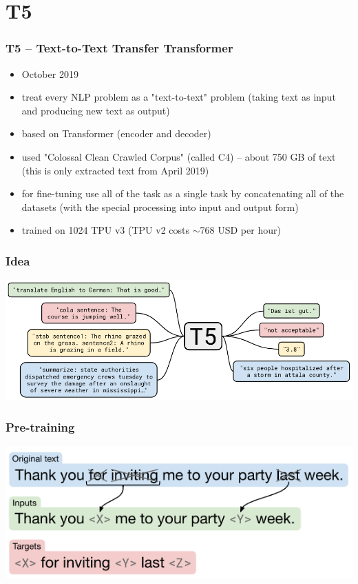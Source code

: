 \documentclass{beamer}
\begin{document}
\section{T5}
\begin{frame}
    \frametitle{T5 -- Text-to-Text Transfer Transformer \cite{t5}}
    \begin{itemize}
        \item October 2019
        \item treat every NLP problem as a "text-to-text" problem (taking text as input and producing new text as output)
        \item based on Transformer (encoder and decoder)
        \item used "Colossal Clean Crawled Corpus" (called C4) -- about 750 GB of text (this is only extracted text from April 2019)
        \item for fine-tuning use all of the task as a single task by concatenating all of the datasets (with the special processing into input and output form)
        \item trained on 1024 TPU v3 (TPU v2 costs $\sim$768 USD per hour)
    \end{itemize}
\end{frame}

\begin{frame}
    \frametitle{Idea}
    \begin{center}
        \includegraphics[scale=1.4]{img/t5-idea.png}
    \end{center}
\end{frame}

\begin{frame}
    \frametitle{Pre-training}
    \begin{center}
        \includegraphics[scale=1.4]{img/t5-baseline-model.png}
    \end{center}
\end{frame}
\end{document}
